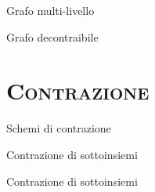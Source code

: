 \documentclass[xcolor=x11names,compress]{beamer}
\begin{document}
{
\begin{frame}[t]{Grafo multi-livello}
    \vspace{-0.5cm}
    
    
\end{frame}}

{
\begin{frame}[t]{Grafo decontraibile}
    
\end{frame}}

\section{\scshape Contrazione}
{
\begin{frame}[t]{Schemi di contrazione}
    \vspace{-0.5cm}
    
    
    
    
    
\end{frame}}

{
\begin{frame}[t]{Contrazione di sottoinsiemi}
    \vspace{-0.5cm}
    
\end{frame}}

{
\begin{frame}[t]{Contrazione di sottoinsiemi}
    \vspace{-0.5cm}
    
    \begin{minipage}[t]{\textwidth}
        \centering
        
    \end{minipage}
\end{frame}}
\end{document}
